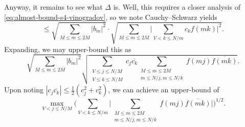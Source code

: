 \documentclass[../notes.tex]{subfiles}
\begin{document}
Anyway, it remains to see what $\Delta$ is. Well, this requires a closer analysis of \eqref{eq:almost-bound-s4-vinogradov}, so we note Cauchy--Schwarz yields
\[\le\sqrt{\sum_{M\le m\le2M}|b_m|^2}\cdot\sqrt{\sum_{M\le m\le2M}\Bigg|\sum_{V<k\le N/m}c_kf(mk)\Bigg|^2}.\]
Expanding, we may upper-bound this as
\[\sqrt{\sum_{M\le m\le2M}|b_m|^2}\sqrt{\sum_{\substack{V\le j\le N/M\\V\le k\le N/M}}c_j\overline{c_k}\sum_{\substack{M\le m\le2M\\m\le N/j,m\le N/k}}f(mj)\overline{f(mk)}}.\]
Upon noting $|c_j\overline{c_k}|\le\frac12\left(c_j^2+c_k^2\right)$, we can achieve an upper-bound of
\[\max_{V<j\le N/M}\Bigg(\sum_{V<k\le N/m}\Bigg|\sum_{\substack{M\le m\le2M\\m\le N/j,m\le N/k}}f(mj)\overline{f(mk)}\Bigg|\Bigg)^{1/2}.\]
\end{document}
